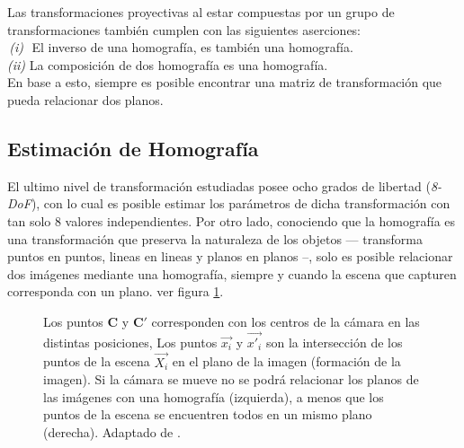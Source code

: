 Las transformaciones proyectivas al estar compuestas por un grupo de transformaciones  también cumplen con las siguientes aserciones: \\
\textit{$\,$(i)$\,\,$}  El inverso de una homografía, es también una homografía.\\
\textit{(ii)} La composición de dos homografía es una homografía.\\
En base a esto, siempre es posible encontrar una matriz de transformación que pueda relacionar dos planos.


\subsection{Estimación de Homografía}

El ultimo nivel de transformación estudiadas posee ocho grados de libertad (\textit{8-DoF}), con lo cual es posible estimar los parámetros de dicha transformación con tan solo 8 valores independientes. Por otro lado, conociendo que la homografía es una transformación que preserva la naturaleza de los objetos --- transforma puntos en puntos, lineas en lineas y planos en planos --, solo es posible relacionar dos imágenes mediante una homografía, siempre y cuando la escena que capturen corresponda con un plano. ver figura \ref{imagen:planos}.


\begin{figure}[h]
	\centering     %
	\hspace{5mm}%
	\caption[Relacion de homografías]{Los puntos $\mathbf{C}$ y $\mathbf{C'}$ corresponden con los centros de la cámara en las distintas posiciones, Los puntos $\vec{x_i}$ y $\vec{x'_i}$ son la intersección de los puntos de la escena $\vec{X_i}$ en el plano de la imagen (formación de la imagen). Si la cámara se mueve no se podrá relacionar los planos de las imágenes con una homografía (izquierda), a menos que los puntos de la escena se encuentren todos en un mismo plano (derecha). Adaptado de \cite{zisserman}.}
	\label{imagen:planos}
\end{figure}

